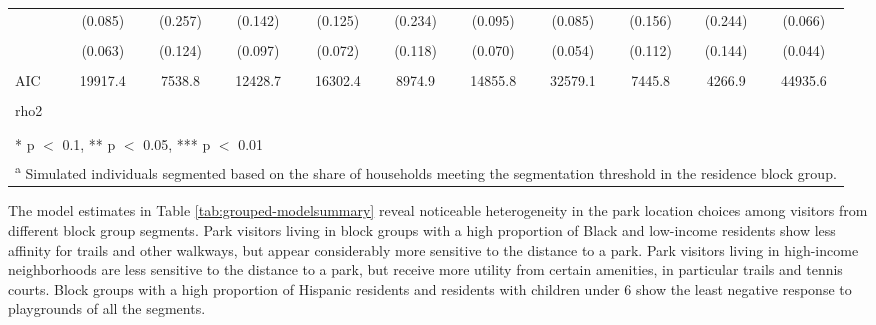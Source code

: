 \documentclass[3p, authoryear, review]{elsarticle} %
\begin{document}
\begin{landscape}
\begin{table}
{\begin{tabular}[t]{lcccccccccc}
 & (0.085) & (0.257) & (0.142) & (0.125) & (0.234) & (0.095) & (0.085) & (0.156) & (0.244) & (0.066)\\
\cellcolor{gray!6}{Other Sport} & \cellcolor{gray!6}{-0.139**} & \cellcolor{gray!6}{-0.368***} & \cellcolor{gray!6}{-0.449***} & \cellcolor{gray!6}{-0.254***} & \cellcolor{gray!6}{-0.620***} & \cellcolor{gray!6}{-0.099} & \cellcolor{gray!6}{-0.266***} & \cellcolor{gray!6}{-0.036} & \cellcolor{gray!6}{-0.385***} & \cellcolor{gray!6}{-0.259***}\\
 & (0.063) & (0.124) & (0.097) & (0.072) & (0.118) & (0.070) & (0.054) & (0.112) & (0.144) & (0.044)\\
\midrule
\cellcolor{gray!6}{Num.Obs.} & \cellcolor{gray!6}{6781} & \cellcolor{gray!6}{2637} & \cellcolor{gray!6}{3868} & \cellcolor{gray!6}{6714} & \cellcolor{gray!6}{3017} & \cellcolor{gray!6}{5769} & \cellcolor{gray!6}{11214} & \cellcolor{gray!6}{2371} & \cellcolor{gray!6}{1699} & \cellcolor{gray!6}{15930}\\
AIC & 19917.4 & 7538.8 & 12428.7 & 16302.4 & 8974.9 & 14855.8 & 32579.1 & 7445.8 & 4266.9 & 44935.6\\
\cellcolor{gray!6}{Log.Lik.} & \cellcolor{gray!6}{-9948.721} & \cellcolor{gray!6}{-3759.382} & \cellcolor{gray!6}{-6204.365} & \cellcolor{gray!6}{-8141.206} & \cellcolor{gray!6}{-4477.442} & \cellcolor{gray!6}{-7417.907} & \cellcolor{gray!6}{-16279.541} & \cellcolor{gray!6}{-3712.922} & \cellcolor{gray!6}{-2123.432} & \cellcolor{gray!6}{-22457.789}\\
rho2 &  &  &  &  &  &  &  &  &  & \\
\cellcolor{gray!6}{rho20} & \cellcolor{gray!6}{0.388} & \cellcolor{gray!6}{0.405} & \cellcolor{gray!6}{0.331} & \cellcolor{gray!6}{0.494} & \cellcolor{gray!6}{0.381} & \cellcolor{gray!6}{0.464} & \cellcolor{gray!6}{0.395} & \cellcolor{gray!6}{0.347} & \cellcolor{gray!6}{0.479} & \cellcolor{gray!6}{0.412}\\
\bottomrule
\multicolumn{11}{l}{\textsuperscript{} * p $<$ 0.1, ** p $<$ 0.05, *** p $<$ 0.01}\\
\multicolumn{11}{l}{\textsuperscript{a} Simulated individuals segmented based on the share of households meeting the segmentation threshold in the residence block group.}\\
\end{tabular}}
\end{table}
\end{landscape}

The model estimates in Table \ref{tab:grouped-modelsummary} reveal noticeable heterogeneity in the park location choices among visitors from different block group segments. Park visitors living in block groups with a high proportion of Black and low-income residents show less affinity for trails and other walkways, but appear considerably more sensitive to the distance to a park. Park visitors living in high-income neighborhoods are less sensitive to the distance to a park, but receive more utility from certain amenities, in particular trails and tennis courts. Block groups with a high proportion of Hispanic residents and residents with children under 6 show the least negative response to playgrounds of all the segments.
\end{document}
